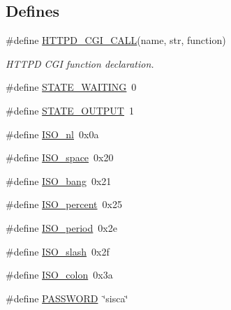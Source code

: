 \subsection*{Defines}
\begin{DoxyCompactItemize}
\item 
\#define \hyperlink{group__httpd_ga1dbc635a2924806f42d7e3273a6a69b5}{HTTPD\_\-CGI\_\-CALL}(name, str, function)
\begin{DoxyCompactList}\small\item\em HTTPD CGI function declaration. \item\end{DoxyCompactList}\item 
\#define \hyperlink{group__httpd_ga7d7920c1e51cc4eef80206ebd6fee3f4}{STATE\_\-WAITING}~0
\item 
\#define \hyperlink{group__httpd_ga8a645f8831837320c4e0c704e871abcf}{STATE\_\-OUTPUT}~1
\item 
\#define \hyperlink{group__httpd_ga3212e70c55244608ac16316888c354f0}{ISO\_\-nl}~0x0a
\item 
\#define \hyperlink{group__httpd_ga71e1b022f7b7fa3a154f19372b239935}{ISO\_\-space}~0x20
\item 
\#define \hyperlink{group__httpd_gae3f8f7deae69854853b0c8ebb82c380d}{ISO\_\-bang}~0x21
\item 
\#define \hyperlink{group__httpd_ga79f9a50c2cccb967d38a2eeb45d2fd75}{ISO\_\-percent}~0x25
\item 
\#define \hyperlink{group__httpd_gaf7dd2757d1e766f65b01ba7c91c660a0}{ISO\_\-period}~0x2e
\item 
\#define \hyperlink{group__httpd_ga820fb27c50e7bb4ac6d9eae1b06630a5}{ISO\_\-slash}~0x2f
\item 
\#define \hyperlink{group__httpd_ga14e276fa8e765f774f4162619f1c8fc1}{ISO\_\-colon}~0x3a
\item 
\#define \hyperlink{group__httpd_ga9e8538fad4eee548302ad9f60e6d47ca}{PASSWORD}~\char`\"{}sisca\char`\"{}
\end{DoxyCompactItemize}
